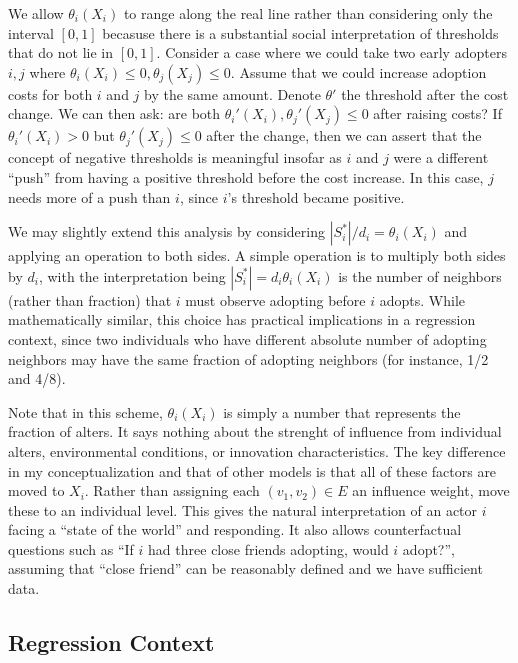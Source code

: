 \documentclass{article}
\begin{document}
We allow $\theta_i(X_i)$ to range along the real line rather than considering only the interval $[0,1]$ becasuse there is a substantial social interpretation of thresholds that do not lie in $[0,1]$. Consider a case where we could take two early adopters $i, j$ where $\theta_i(X_i) \le 0, \theta_j(X_j) \le 0$. Assume that we could increase adoption costs for both $i$ and $j$ by the same amount. Denote $\theta'$ the threshold after the cost change. We can then ask: are both $\theta_i'(X_i), \theta_j'(X_j) \le 0$ after raising costs? If $\theta_i'(X_i) > 0$ but $\theta_j'(X_j) \le 0$ after the change, then we can assert that the concept of negative thresholds is meaningful insofar as $i$ and $j$ were a different ``push'' from having a positive threshold before the cost increase. In this case, $j$ needs more of a push than $i$, since $i$'s threshold became positive.

We may slightly extend this analysis by considering $|S_i^*|/d_i = \theta_i(X_i)$ and applying an operation to both sides. A simple operation is to multiply both sides by $d_i$, with the interpretation being $|S_i^*| = d_i \theta_i(X_i)$ is the number of neighbors (rather than fraction) that $i$ must observe adopting before $i$ adopts. While mathematically similar, this choice has practical implications in a regression context, since two individuals who have different absolute number of adopting neighbors may have the same fraction of adopting neighbors (for instance, 1/2 and 4/8).

Note that in this scheme, $\theta_i(X_i)$ is simply a number that represents the fraction of alters. It says nothing about the strenght of influence from individual alters, environmental conditions, or innovation characteristics. The key difference in my conceptualization and that of other models is that all of these factors are moved to $X_i$. Rather than assigning each $(v_1,v_2) \in E$ an influence weight, move these to an individual level. This gives the natural interpretation of an actor $i$ facing a ``state of the world'' and responding. It also allows counterfactual questions such as ``If $i$ had three close friends adopting, would $i$ adopt?'', assuming that ``close friend'' can be reasonably defined and we have sufficient data.

\subsection{Regression Context}
\end{document}
